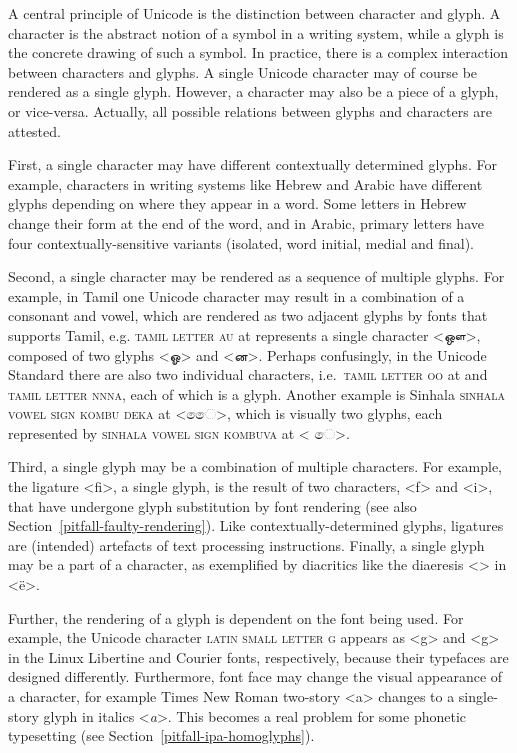 A central principle of Unicode is the distinction between character and glyph. A
character is the abstract notion of a symbol in a writing system, while a glyph
is the concrete drawing of such a symbol. In practice, there is a complex
interaction between characters and glyphs. A single Unicode character may of
course be rendered as a single glyph. However, a character may also be a piece
of a glyph, or vice-versa. Actually, all possible relations between glyphs and
characters are attested.

First, a single character may have different contextually determined glyphs. For
example, characters in writing systems like Hebrew and Arabic have different
glyphs depending on where they appear in a word. Some letters in Hebrew change
their form at the end of the word, and in Arabic, primary letters have four
contextually-sensitive variants (isolated, word initial, medial and final).

Second, a single character may be rendered as a sequence of multiple glyphs. For
example, in Tamil one Unicode character may result in a combination of a
consonant and vowel, which are rendered as two adjacent glyphs by fonts that
supports Tamil, e.g. \textsc{tamil letter au} at  represents a single 
character <ஔ>, composed of two glyphs <ஓ> and <ன>. Perhaps confusingly, 
in the Unicode Standard there are also two individual characters, 
i.e.\ \textsc{tamil letter oo} at  and 
 \textsc{tamil letter nnna}, each of which is a glyph. Another example is 
Sinhala \textsc{sinhala vowel sign kombu deka} at  <ෛ>, which is 
visually two glyphs, each represented by \textsc{sinhala vowel sign kombuva} 
at  < ෙ>.

Third, a single glyph may be a combination of multiple characters. For example, 
the ligature <ﬁ>, a single glyph, is the result of two
characters, <f> and <i>, that have undergone glyph substitution by font
rendering (see also Section~\ref{pitfall-faulty-rendering}). Like
contextually-determined glyphs, ligatures are (intended) artefacts of text
processing instructions. Finally, a single glyph may be a part of a
character, as exemplified by diacritics like the diaeresis <> in <ë>.

Further, the rendering of a glyph is dependent on the font being used. For
example, the Unicode character \textsc{latin small letter g} appears as <g> and
<{g}> in the Linux Libertine and Courier fonts, respectively,
because their typefaces are designed differently. Furthermore, font face may
change the visual appearance of a character, for example Times New Roman
two-story <{a}> changes to a single-story glyph in italics
<\emph{a}>. This becomes a real problem for some
phonetic typesetting (see Section~\ref{pitfall-ipa-homoglyphs}).

